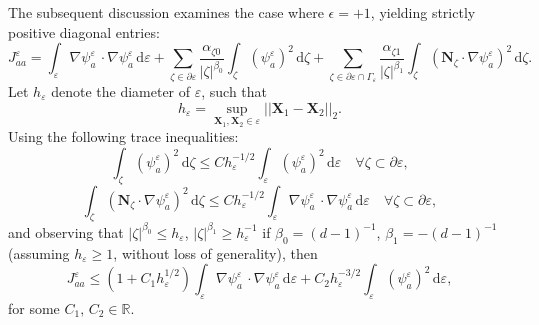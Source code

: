 The subsequent discussion examines the case where $\epsilon = +1$, yielding strictly positive diagonal entries:
\begin{equation}
	J^{\varepsilon}_{aa} = \int_{\varepsilon} \nabla \psi^{\varepsilon}_{a} \, \cdot \nabla \psi^{\varepsilon}_{a} \, \mathrm d \varepsilon + \sum_{\zeta \in \partial \varepsilon} \frac{\alpha_{\zeta0}}{|\zeta|^{\beta_0}} \int_{\zeta} \left( \psi_a^{\varepsilon} \right)^2 \, \mathrm d \zeta + \sum_{\zeta \in \partial \varepsilon \cap \Gamma_\varepsilon} \frac{\alpha_{\zeta1}}{|\zeta|^{\beta_1}} \int_{\zeta} \left( \bm{N}_{\zeta} \cdot \nabla \psi^{\varepsilon}_a \right)^2 \, \mathrm d \zeta.
\end{equation}
Let $h_{\varepsilon}$ denote the diameter of $\varepsilon$, such that
\begin{equation}
	h_{\varepsilon} = \sup_{\bm{X}_1, \bm{X}_2 \in \varepsilon} ||\bm{X}_1 - \bm{X}_2||_2.
\end{equation}
Using the following trace inequalities:
\begin{equation}
	\int_{\zeta} \left( \psi_a^{\varepsilon} \right)^2 \, \mathrm d \zeta \leq C h_\varepsilon^{-1/2} \int_{\varepsilon} \left( \psi_a^{\varepsilon} \right)^2 \, \mathrm d \varepsilon \quad \forall \zeta \subset \partial \varepsilon,
\end{equation}
\begin{equation}
	\int_{\zeta} \left( \bm{N}_{\zeta} \cdot \nabla \psi^{\varepsilon}_a \right)^2 \, \mathrm d \zeta \leq C h_\varepsilon^{-1/2} \int_{\varepsilon} \nabla \psi^{\varepsilon}_{a} \, \cdot \nabla \psi^{\varepsilon}_{a} \, \mathrm d \varepsilon \quad \forall \zeta \subset \partial \varepsilon,
\end{equation}
and observing that $|\zeta|^{\beta_0} \leq h_\varepsilon$, $|\zeta|^{\beta_1} \geq h_\varepsilon^{-1}$ if $\beta_0 = (d-1)^{-1}$, $\beta_1 = -(d-1)^{-1}$ (assuming $h_\varepsilon \geq 1$, without loss of generality), then
\begin{equation}
	J^{\varepsilon}_{aa} \leq (1 + C_1 h_\varepsilon^{1/2}) \int_{\varepsilon} \nabla \psi^{\varepsilon}_{a} \, \cdot \nabla \psi^{\varepsilon}_{a} \, \mathrm d \varepsilon + C_2 h_\varepsilon^{-3/2} \int_{\varepsilon} \left( \psi_a^{\varepsilon} \right)^2 \, \mathrm d \varepsilon,
\end{equation}
for some $C_1, \, C_2 \in \mathbb{R}$.

